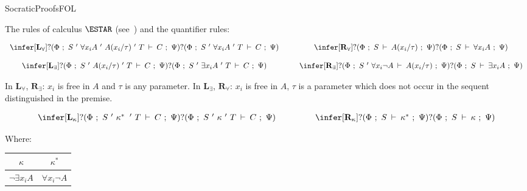 \begin{entry}{SocraticProofsFOL}  

\begin{calculus}

The rules of calculus $\ESTAR$ (see~) and the quantifier rules:

\[
\begin{array}{ccc}

\infer[\textbf{L}_{\forall}]{?(\Phi ~;~ S ~'~ \forall x_{i}A ~'~ A(x_{i}/\tau) ~'~ T\:\vdash\: C ~;~ \Psi)}{?(\Phi ~;~  S ~'~ \forall x_{i}A ~'~ T\:\vdash\: C ~;~ \Psi)}

&~~&

\infer[\textbf{R}_{\forall}]{?(\Phi ~;~  S\:\vdash\: A(x_{i}/\tau) ~;~ \Psi)}{?(\Phi ~;~  S\:\vdash\:\forall x_{i}A ~;~ \Psi)}

\\

&& \\

\infer[\textbf{L}_{\exists}]{?(\Phi ~;~  S ~'~ A(x_{i}/\tau) ~'~ T\:\vdash\: C ~;~ \Psi)}{?(\Phi ~;~  S ~'~ \exists x_{i}A ~'~ T\:\vdash\: C ~;~ \Psi)}

&~~&

\infer[\textbf{R}_{\exists}]{?(\Phi ~;~  S ~'~ \forall x_{i}\neg A\:\vdash\: A(x_{i}/\tau) ~;~ \Psi)}{?(\Phi ~;~  S\:\vdash\:\exists x_{i}A ~;~ \Psi)}

\\
\end{array}
\]

In $\textbf{L}_{\forall}$, $\textbf{R}_{\exists}$: $x_i$ is free in $A$ and $\tau$ is any parameter. In $\textbf{L}_{\exists}$, $\textbf{R}_{\forall}$: $x_i$ is free in $A$, $\tau$ is a parameter which does not occur in the sequent distinguished in the premise.

\[
\begin{array}{ccc}
\infer[\textbf{L}_{\kappa}]{?(\Phi ~;~  S ~'~\kappa^{*}\:~'~ T\:\vdash\: C ~;~ \Psi)}{?(\Phi ~;~  S ~'~ \kappa ~'~ T\:\vdash\: C ~;~ \Psi)}

&~~~~~~~~&

\infer[\textbf{R}_{\kappa}]{?(\Phi ~;~  S\:\vdash\:\kappa^{*} ~;~ \Psi)}{?(\Phi ~;~  S\:\vdash\:\kappa ~;~ \Psi)}
\end{array}
\]

Where:

\begin{center}

	\begin{tabular}{c|c}
			\hline
$\kappa$ & $\kappa^{*}$   \\ 
			\hline
$\neg\exists x_{i}A$ & $\forall x_{i}\neg A$  \\
			

\end{tabular}
\end{center}
\end{calculus}
\end{entry}
